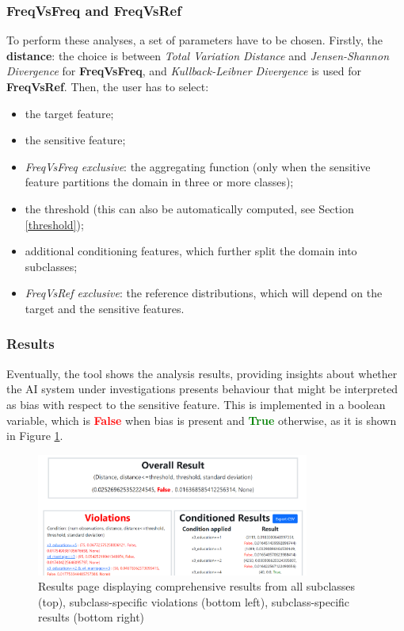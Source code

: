 \documentclass[
]{ceurart}
\begin{document}
\subsubsection{FreqVsFreq and FreqVsRef}
To perform these analyses, a set of parameters have to be chosen. Firstly, the \textbf{distance}: the choice is between \textit{Total Variation Distance} and \textit{Jensen-Shannon Divergence} for \textbf{FreqVsFreq}, and \textit{Kullback-Leibner Divergence} is used for \textbf{FreqVsRef}. Then, the user has to select: 

\begin{itemize}
  \item the target feature;
  \item the sensitive feature;
  \item \textit{FreqVsFreq exclusive}: the aggregating function (only when the sensitive feature partitions the domain in three or more classes);
  \item the threshold (this can also be automatically computed, see Section \ref{threshold});
  \item additional conditioning features, which further split the domain into subclasses;
  \item \textit{FreqVsRef exclusive}: the reference distributions, which will depend on the target and the sensitive features. 
\end{itemize}

\subsubsection{Results}
Eventually, the tool shows the analysis results, providing insights about whether the AI system under investigations presents behaviour that might be interpreted as bias with respect to the sensitive feature. This is implemented in a boolean variable, which is \textbf{\textcolor{red}{False}} when bias is present and \textbf{\textcolor{green}{True}} otherwise, as it is shown in Figure \ref{fig:results}.

\begin{figure}[h]
  \begin{center}
    \includegraphics[width=0.8\textwidth]{frontend_results_page.png}
  \end{center}
  \caption{Results page displaying comprehensive results from all subclasses (top), subclass-specific violations (bottom left), subclass-specific results (bottom right)}
  \label{fig:results}
\end{figure}
\end{document}
